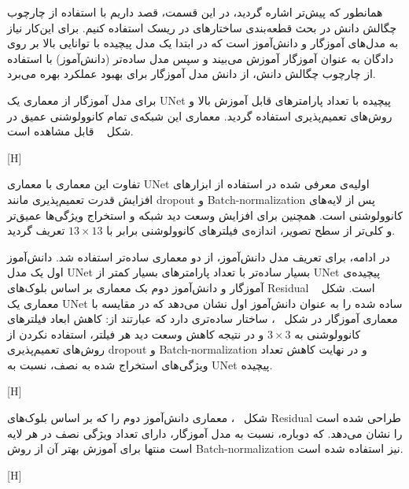 همانطور که پیش‌تر اشاره گردید، در این قسمت، قصد داریم با استفاده از چارچوب چگالش دانش در بحث قطعه‌بندی ساختارهای در ریسک استفاده کنیم. برای این‌کار نیاز به مدل‌های آموزگار و دانش‌آموز است که در ابتدا یک مدل پیچیده با توانایی بالا بر روی دادگان به عنوان آموزگار آموزش می‌بیند و سپس مدل ساده‌تر (دانش‌آموز) با استفاده از چارچوب چگالش دانش، از دانش مدل آموزگار برای بهبود عملکرد بهره می‌برد.

برای مدل آموزگار از معماری یک UNet پیچیده با تعداد پارامتر‌های قابل آموزش بالا و روش‌های تعمیم‌پذیری استفاده گردید. معماری این شبکه‌ی تمام کانوولوشنی عمیق در شکل ~ قابل مشاهده است.

[H]

تفاوت این معماری با معماری UNet اولیه‌ی معرفی شده در  استفاده از ابزارهای افزایش قدرت تعمیم‌پذیری مانند dropout و Batch-normalization پس از لایه‌های کانوولوشنی است. همچنین برای افزایش وسعت دید شبکه و استخراج ویژگی‌ها عمیق‌تر  و کلی‌تر از سطح تصویر، اندازه‌ی فیلتر‌های کانوولوشنی برابر با $13\times13$ تعریف گردید.

در ادامه، برای تعریف مدل دانش‌آموز، از دو معماری ساده‌تر استفاده شد. دانش‌آموز اول یک مدل UNet بسیار ساده‌تر با تعداد پارامترهای بسیار کمتر از UNet پیچیده‌ی آموزگار و دانش‌آموز دوم بک معماری بر اساس بلوک‌های Residual است. شکل ~ معماری یک UNet ساده شده را به عنوان دانش‌آموز اول نشان می‌دهد که در مقایسه با معماری آموزگار در شکل ~، ساختار ساده‌تری دارد که عبارتند از: کاهش ابعاد فیلترهای کانوولوشنی به $3\times3$ و در نتیجه کاهش وسعت دید هر فیلتر، استفاده نکردن از روش‌های تعمیم‌پذیری dropout و Batch-normalization و در نهایت کاهش تعداد ویژگی‌های استخراج شده به نصف، نسبت به UNet پیچیده. 

[H]

شکل ~، معماری دانش‌آموز دوم را که بر اساس بلوک‌های Residual طراحی شده است را نشان می‌دهد. که دوباره، نسبت به مدل آموزگار، دارای تعداد ویژگی نصف در هر لایه‌ است منتها برای آموزش بهتر آن از روش Batch-normalization نیز استفاده شده است.

[H]


